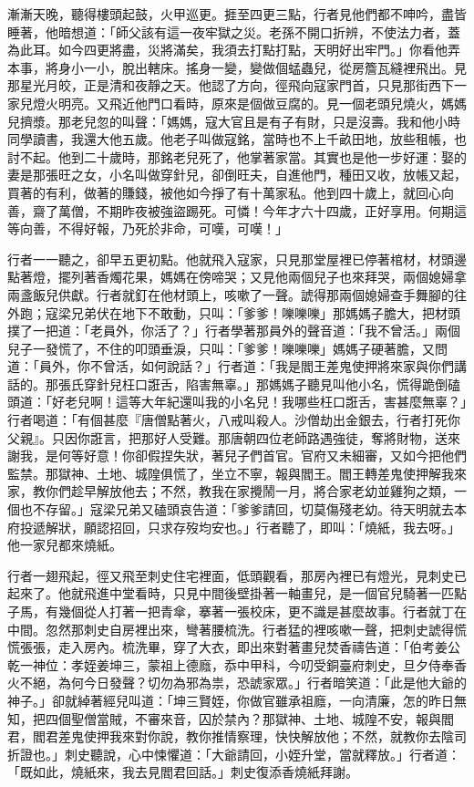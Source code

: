 漸漸天晚，聽得樓頭起鼓，火甲巡更。捱至四更三點，行者見他們都不呻吟，盡皆睡著，他暗想道：「師父該有這一夜牢獄之災。老孫不開口折辨，不使法力者，蓋為此耳。如今四更將盡，災將滿矣，我須去打點打點，天明好出牢門。」你看他弄本事，將身小一小，脫出轄床。搖身一變，變做個蜢蟲兒，從房簷瓦縫裡飛出。見那星光月皎，正是清和夜靜之天。他認了方向，徑飛向寇家門首，只見那街西下一家兒燈火明亮。又飛近他門口看時，原來是個做豆腐的。見一個老頭兒燒火，媽媽兒擠漿。那老兒忽的叫聲：「媽媽，寇大官且是有子有財，只是沒壽。我和他小時同學讀書，我還大他五歲。他老子叫做寇銘，當時也不上千畝田地，放些租帳，也討不起。他到二十歲時，那銘老兒死了，他掌著家當。其實也是他一步好運：娶的妻是那張旺之女，小名叫做穿針兒，卻倒旺夫，自進他門，種田又收，放帳又起，買著的有利，做著的賺錢，被他如今掙了有十萬家私。他到四十歲上，就回心向善，齋了萬僧，不期昨夜被強盜踢死。可憐！今年才六十四歲，正好享用。何期這等向善，不得好報，乃死於非命，可嘆，可嘆！」

行者一一聽之，卻早五更初點。他就飛入寇家，只見那堂屋裡已停著棺材，材頭邊點著燈，擺列著香燭花果，媽媽在傍啼哭；又見他兩個兒子也來拜哭，兩個媳婦拿兩盞飯兒供獻。行者就釘在他材頭上，咳嗽了一聲。諕得那兩個媳婦查手舞腳的往外跑；寇梁兄弟伏在地下不敢動，只叫：「爹爹！嚛嚛嚛」那媽媽子膽大，把材頭撲了一把道：「老員外，你活了？」行者學著那員外的聲音道：「我不曾活。」兩個兒子一發慌了，不住的叩頭垂淚，只叫：「爹爹！嚛嚛嚛」媽媽子硬著膽，又問道：「員外，你不曾活，如何說話？」行者道：「我是閻王差鬼使押將來家與你們講話的。那張氏穿針兒枉口誑舌，陷害無辜。」那媽媽子聽見叫他小名，慌得跪倒磕頭道：「好老兒啊！這等大年紀還叫我的小名兒！我哪些枉口誑舌，害甚麼無辜？」行者喝道：「有個甚麼『唐僧點著火，八戒叫殺人。沙僧劫出金銀去，行者打死你父親』。只因你誑言，把那好人受難。那唐朝四位老師路遇強徒，奪將財物，送來謝我，是何等好意！你卻假捏失狀，著兒子們首官。官府又未細審，又如今把他們監禁。那獄神、土地、城隍俱慌了，坐立不寧，報與閻王。閻王轉差鬼使押解我來家，教你們趁早解放他去；不然，教我在家攪鬧一月，將合家老幼並雞狗之類，一個也不存留。」寇梁兄弟又磕頭哀告道：「爹爹請回，切莫傷殘老幼。待天明就去本府投遞解狀，願認招回，只求存歿均安也。」行者聽了，即叫：「燒紙，我去呀。」他一家兒都來燒紙。

行者一翅飛起，徑又飛至刺史住宅裡面，低頭觀看，那房內裡已有燈光，見刺史已起來了。他就飛進中堂看時，只見中間後壁掛著一軸畫兒，是一個官兒騎著一匹點子馬，有幾個從人打著一把青傘，搴著一張校床，更不識是甚麼故事。行者就丁在中間。忽然那刺史自房裡出來，彎著腰梳洗。行者猛的裡咳嗽一聲，把刺史諕得慌慌張張，走入房內。梳洗畢，穿了大衣，即出來對著畫兒焚香禱告道：「伯考姜公乾一神位：孝姪姜坤三，蒙祖上德廕，忝中甲科，今叨受銅臺府刺史，旦夕侍奉香火不絕，為何今日發聲？切勿為邪為祟，恐諕家眾。」行者暗笑道：「此是他大爺的神子。」卻就綽著經兒叫道：「坤三賢姪，你做官雖承祖廕，一向清廉，怎的昨日無知，把四個聖僧當賊，不審來音，囚於禁內？那獄神、土地、城隍不安，報與閻君，閻君差鬼使押我來對你說，教你推情察理，快快解放他；不然，就教你去陰司折證也。」刺史聽說，心中悚懼道：「大爺請回，小姪升堂，當就釋放。」行者道：「既如此，燒紙來，我去見閻君回話。」刺史復添香燒紙拜謝。


